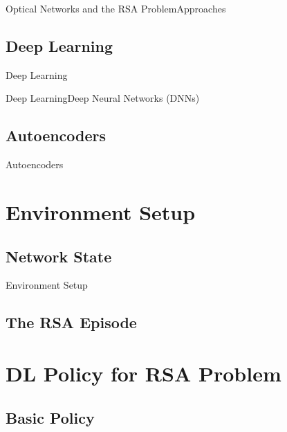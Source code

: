 \documentclass[english,american,german,aspectratio=169]{beamer}
\begin{document}
\begin{frame}{Optical Networks and the RSA Problem}{Approaches}
	
\end{frame}


\subsection{Deep Learning}

\begin{frame}{Deep Learning}{}
	
\end{frame}


\begin{frame}{Deep Learning}{Deep Neural Networks (DNNs)}
            
\end{frame}


\subsection{Autoencoders}

\begin{frame}{Autoencoders}{}
	
\end{frame}


\section{Environment Setup}


\subsection{Network State}

\begin{frame}{Environment Setup}{}
	
\end{frame}


\subsection{The RSA Episode}



\section{DL Policy for RSA Problem}

\subsection{Basic Policy}
\end{document}

